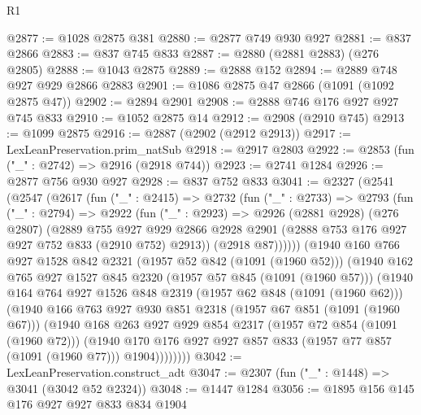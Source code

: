 \begin{lexlean}{R1}
\begin{coremodule}
@2877 := @1028 @2875 @381
@2880 := @2877 @749 @930 @927
@2881 := @837 @2866
@2883 := @837 @745 @833
@2887 := @2880 (@2881 @2883) (@276 @2805)
@2888 := @1043 @2875
@2889 := @2888 @152
@2894 := @2889 @748 @927 @929 @2866 @2883
@2901 := @1086 @2875 @47 @2866 (@1091 (@1092 @2875 @47))
@2902 := @2894 @2901
@2908 := @2888 @746 @176 @927 @927 @745 @833
@2910 := @1052 @2875 @14
@2912 := @2908 (@2910 @745)
@2913 := @1099 @2875
@2916 := @2887 (@2902 (@2912 @2913))
@2917 := LexLeanPreservation.prim_natSub
@2918 := @2917 @2803
@2922 := @2853 (fun ("_" : @2742) => @2916 (@2918 @744))
@2923 := @2741 @1284
@2926 := @2877 @756 @930 @927
@2928 := @837 @752 @833
@3041 := @2327
    (@2541
      (@2547
        (@2617
          (fun ("_" : @2415) =>
          @2732
            (fun ("_" : @2733) =>
            @2793
              (fun ("_" : @2794) =>
              @2922
                (fun ("_" : @2923) =>
                @2926
                  (@2881 @2928)
                  (@276 @2807)
                  (@2889
                    @755
                    @927
                    @929
                    @2866
                    @2928
                    @2901
                    (@2888 @753 @176 @927 @927 @752 @833 (@2910 @752) @2913))
                  (@2918 @87))))))
        (@1940
          @160
          @766
          @927
          @1528
          @842
          @2321
          (@1957 @52 @842 (@1091 (@1960 @52)))
          (@1940
            @162
            @765
            @927
            @1527
            @845
            @2320
            (@1957 @57 @845 (@1091 (@1960 @57)))
            (@1940
              @164
              @764
              @927
              @1526
              @848
              @2319
              (@1957 @62 @848 (@1091 (@1960 @62)))
              (@1940
                @166
                @763
                @927
                @930
                @851
                @2318
                (@1957 @67 @851 (@1091 (@1960 @67)))
                (@1940
                  @168
                  @263
                  @927
                  @929
                  @854
                  @2317
                  (@1957 @72 @854 (@1091 (@1960 @72)))
                  (@1940
                    @170
                    @176
                    @927
                    @927
                    @857
                    @833
                    (@1957 @77 @857 (@1091 (@1960 @77)))
                    @1904))))))))
@3042 := LexLeanPreservation.construct_adt
@3047 := @2307 (fun ("_" : @1448) => @3041 (@3042 @52 @2324))
@3048 := @1447 @1284
@3056 := @1895 @156 @145 @176 @927 @927 @833 @834 @1904

\end{coremodule}
\end{lexlean}
